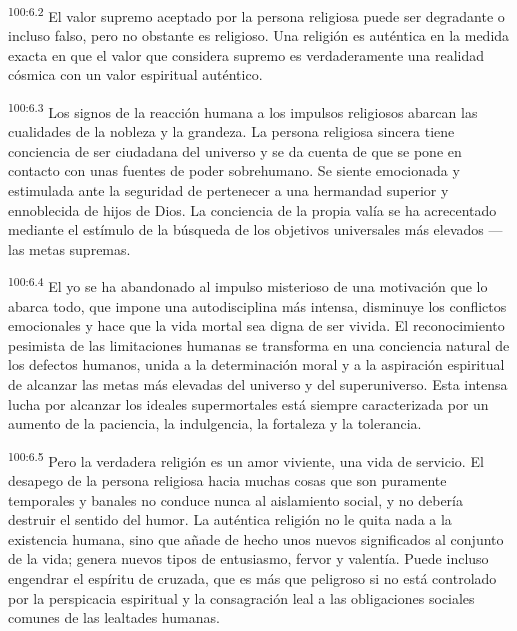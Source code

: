 \par
\textsuperscript{100:6.2} El valor supremo aceptado por la persona religiosa puede ser degradante o incluso falso, pero no obstante es religioso. Una religión es auténtica en la medida exacta en que el valor que considera supremo es verdaderamente una realidad cósmica con un valor espiritual auténtico.

\par
\textsuperscript{100:6.3} Los signos de la reacción humana a los impulsos religiosos abarcan las cualidades de la nobleza y la grandeza. La persona religiosa sincera tiene conciencia de ser ciudadana del universo y se da cuenta de que se pone en contacto con unas fuentes de poder sobrehumano. Se siente emocionada y estimulada ante la seguridad de pertenecer a una hermandad superior y ennoblecida de hijos de Dios. La conciencia de la propia valía se ha acrecentado mediante el estímulo de la búsqueda de los objetivos universales más elevados ---las metas supremas.

\par
\textsuperscript{100:6.4} El yo se ha abandonado al impulso misterioso de una motivación que lo abarca todo, que impone una autodisciplina más intensa, disminuye los conflictos emocionales y hace que la vida mortal sea digna de ser vivida. El reconocimiento pesimista de las limitaciones humanas se transforma en una conciencia natural de los defectos humanos, unida a la determinación moral y a la aspiración espiritual de alcanzar las metas más elevadas del universo y del superuniverso. Esta intensa lucha por alcanzar los ideales supermortales está siempre caracterizada por un aumento de la paciencia, la indulgencia, la fortaleza y la tolerancia.

\par
\textsuperscript{100:6.5} Pero la verdadera religión es un amor viviente, una vida de servicio. El desapego de la persona religiosa hacia muchas cosas que son puramente temporales y banales no conduce nunca al aislamiento social, y no debería destruir el sentido del humor. La auténtica religión no le quita nada a la existencia humana, sino que añade de hecho unos nuevos significados al conjunto de la vida; genera nuevos tipos de entusiasmo, fervor y valentía. Puede incluso engendrar el espíritu de cruzada, que es más que peligroso si no está controlado por la perspicacia espiritual y la consagración leal a las obligaciones sociales comunes de las lealtades humanas.

